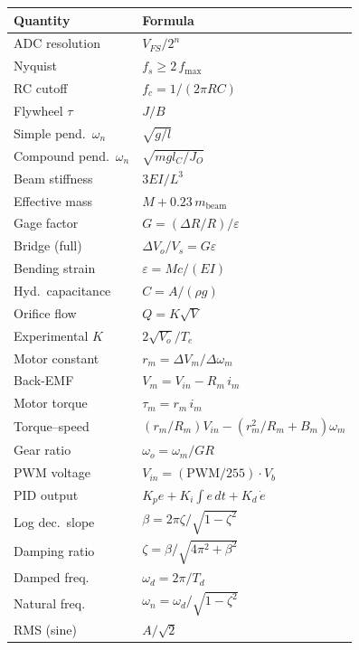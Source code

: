 \documentclass[9pt,twocolumn]{article}
\begin{document}
\begin{center}
\renewcommand{\arraystretch}{1.3}
\small
\begin{tabular}{p{2.6cm}l}
\toprule
\textbf{Quantity} & \textbf{Formula}\\
\midrule
ADC resolution & $V_{FS}/2^n$\\
Nyquist & $f_s \geq 2\,f_{\max}$\\
RC cutoff & $f_c = 1/(2\pi RC)$\\
Flywheel $\tau$ & $J/B$\\
Simple pend.\ $\omega_n$ & $\sqrt{g/l}$\\
Compound pend.\ $\omega_n$ & $\sqrt{mgl_C/J_O}$\\
Beam stiffness & $3EI/L^3$\\
Effective mass & $M + 0.23\,m_{\text{beam}}$\\
Gage factor & $G = (\Delta R/R)/\varepsilon$\\
Bridge (full) & $\Delta V_o/V_s = G\varepsilon$\\
Bending strain & $\varepsilon = Mc/(EI)$\\
Hyd.\ capacitance & $C = A/(\rho g)$\\
Orifice flow & $Q = K\sqrt{V}$\\
Experimental $K$ & $2\sqrt{V_o}/T_e$\\
Motor constant & $r_m = \Delta V_m/\Delta\omega_m$\\
Back-EMF & $V_m = V_{in} - R_m\,i_m$\\
Motor torque & $\tau_m = r_m\,i_m$\\
Torque--speed & $(r_m/R_m)V_{in} - (r_m^2/R_m{+}B_m)\omega_m$\\
Gear ratio & $\omega_o = \omega_m/GR$\\
PWM voltage & $V_{in} = (\text{PWM}/255)\cdot V_b$\\
PID output & $K_p e + K_i\!\int\!e\,dt + K_d\,\dot{e}$\\
Log dec.\ slope & $\beta = 2\pi\zeta/\sqrt{1-\zeta^2}$\\
Damping ratio & $\zeta = \beta/\sqrt{4\pi^2+\beta^2}$\\
Damped freq. & $\omega_d = 2\pi/T_d$\\
Natural freq. & $\omega_n = \omega_d/\sqrt{1-\zeta^2}$\\
RMS (sine) & $A/\sqrt{2}$\\
\bottomrule
\end{tabular}
\end{center}
\end{document}
